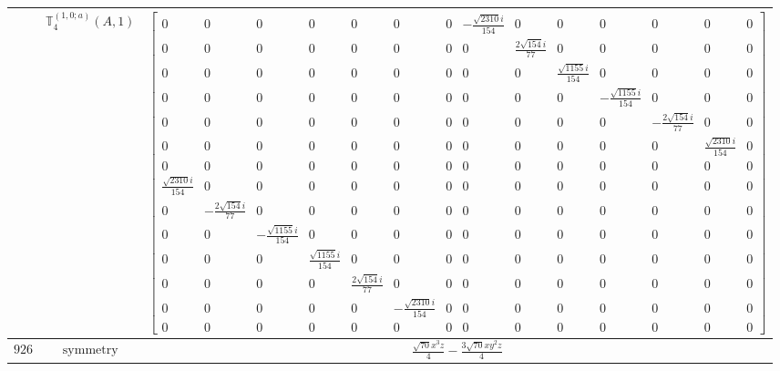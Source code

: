 \documentclass[fleqn,8pt,landscape]{jsarticle}
\begin{document}
\begin{longtable}{ccc}
$  $ & $ \mathbb{T}_{4}^{(1,0;a)}(A,1) $ & $ \begin{bmatrix} 0 & 0 & 0 & 0 & 0 & 0 & 0 & - \frac{\sqrt{2310} i}{154} & 0 & 0 & 0 & 0 & 0 & 0 \\ 0 & 0 & 0 & 0 & 0 & 0 & 0 & 0 & \frac{2 \sqrt{154} i}{77} & 0 & 0 & 0 & 0 & 0 \\ 0 & 0 & 0 & 0 & 0 & 0 & 0 & 0 & 0 & \frac{\sqrt{1155} i}{154} & 0 & 0 & 0 & 0 \\ 0 & 0 & 0 & 0 & 0 & 0 & 0 & 0 & 0 & 0 & - \frac{\sqrt{1155} i}{154} & 0 & 0 & 0 \\ 0 & 0 & 0 & 0 & 0 & 0 & 0 & 0 & 0 & 0 & 0 & - \frac{2 \sqrt{154} i}{77} & 0 & 0 \\ 0 & 0 & 0 & 0 & 0 & 0 & 0 & 0 & 0 & 0 & 0 & 0 & \frac{\sqrt{2310} i}{154} & 0 \\ 0 & 0 & 0 & 0 & 0 & 0 & 0 & 0 & 0 & 0 & 0 & 0 & 0 & 0 \\ \frac{\sqrt{2310} i}{154} & 0 & 0 & 0 & 0 & 0 & 0 & 0 & 0 & 0 & 0 & 0 & 0 & 0 \\ 0 & - \frac{2 \sqrt{154} i}{77} & 0 & 0 & 0 & 0 & 0 & 0 & 0 & 0 & 0 & 0 & 0 & 0 \\ 0 & 0 & - \frac{\sqrt{1155} i}{154} & 0 & 0 & 0 & 0 & 0 & 0 & 0 & 0 & 0 & 0 & 0 \\ 0 & 0 & 0 & \frac{\sqrt{1155} i}{154} & 0 & 0 & 0 & 0 & 0 & 0 & 0 & 0 & 0 & 0 \\ 0 & 0 & 0 & 0 & \frac{2 \sqrt{154} i}{77} & 0 & 0 & 0 & 0 & 0 & 0 & 0 & 0 & 0 \\ 0 & 0 & 0 & 0 & 0 & - \frac{\sqrt{2310} i}{154} & 0 & 0 & 0 & 0 & 0 & 0 & 0 & 0 \\ 0 & 0 & 0 & 0 & 0 & 0 & 0 & 0 & 0 & 0 & 0 & 0 & 0 & 0 \end{bmatrix} $ \\ \hline
$ 926 $ & $ \text{symmetry} $ & $ \frac{\sqrt{70} x^{3} z}{4} - \frac{3 \sqrt{70} x y^{2} z}{4} $ \\

\end{longtable}
\end{document}
